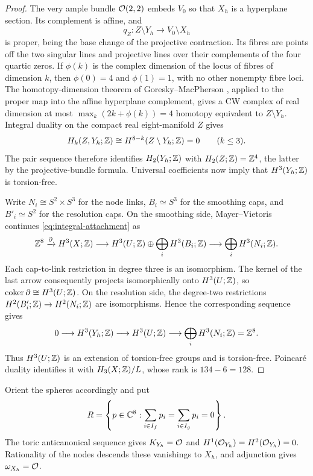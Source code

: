\begin{proof}
The very ample bundle $\mathcal O(2,2)$ embeds $V_0$ so that $X_h$
is a hyperplane section. Its complement is affine, and
\[
 q_Z:Z\setminus Y_h\longrightarrow V_0\setminus X_h
\]
is proper, being the base change of the projective contraction.
Its fibres are points off the two singular lines and projective
lines over their complements of the four quartic zeros.
If $\phi(k)$ is the complex dimension of the locus of fibres of
dimension $k$, then $\phi(0)=4$ and $\phi(1)=1$, with no other
nonempty fibre loci. The homotopy-dimension theorem of
Goresky--MacPherson \cite[Part~II, \S1.1*, p.~152]{GoreskyMacPherson},
applied to the proper map into the affine hyperplane complement,
gives a CW complex of real dimension at most
$\max_k(2k+\phi(k))=4$ homotopy equivalent to $Z\setminus Y_h$.
Integral duality on the compact real eight-manifold $Z$ gives
\[
 H_k(Z,Y_h;\mathbb Z)\cong H^{8-k}(Z\setminus Y_h;\mathbb Z)=0
                         \qquad(k\le3).
\]
The pair sequence therefore identifies $H_2(Y_h;\mathbb Z)$ with
$H_2(Z;\mathbb Z)=\mathbb Z^4$, the latter by the projective-bundle formula.
Universal coefficients now imply that $H^3(Y_h;\mathbb Z)$ is torsion-free.

Write $N_i\cong S^2\times S^3$ for the node links, $B_i\simeq S^3$
for the smoothing caps, and $B'_i\simeq S^2$ for the resolution caps.
On the smoothing side, Mayer--Vietoris continues
\eqref{eq:integral-attachment} as
\[
 \mathbb Z^8\xrightarrow{\partial}H^3(X;\mathbb Z)
 \longrightarrow H^3(U;\mathbb Z)\oplus\bigoplus_iH^3(B_i;\mathbb Z)
 \longrightarrow\bigoplus_iH^3(N_i;\mathbb Z).
\]
Each cap-to-link restriction in degree three is an isomorphism.
The kernel of the last arrow consequently projects isomorphically
onto $H^3(U;\mathbb Z)$, so $\operatorname{coker}\partial\cong H^3(U;\mathbb Z)$.
On the resolution side, the degree-two restrictions
$H^2(B'_i;\mathbb Z)\to H^2(N_i;\mathbb Z)$ are isomorphisms. Hence the
corresponding sequence gives
\[
 0\longrightarrow H^3(Y_h;\mathbb Z)\longrightarrow H^3(U;\mathbb Z)
                    \longrightarrow\bigoplus_iH^3(N_i;\mathbb Z)=\mathbb Z^8.
\]
Thus $H^3(U;\mathbb Z)$ is an extension of torsion-free groups and is
torsion-free. Poincar\'e duality identifies it with
$H_3(X;\mathbb Z)/L$, whose rank is $134-6=128$.
\end{proof}

Orient the spheres accordingly and put
\begin{equation}\label{eq:period-space}
 R=\left\{p\in\mathbb C^8:
       \sum_{i\in I_f}p_i=\sum_{i\in I_g}p_i=0\right\}.
\end{equation}
The toric anticanonical sequence gives $K_{Y_h}=\mathcal O$ and
$H^1(\mathcal O_{Y_h})=H^2(\mathcal O_{Y_h})=0$. Rationality of the nodes
descends these vanishings to $X_h$, and adjunction gives
$\omega_{X_h}=\mathcal O$.

